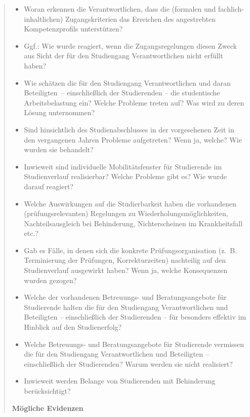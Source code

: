 \begin{quote}
\begin{itemize}
\item
  Woran erkennen die Verantwortlichen, dass die (formalen und
  fachlich-inhaltlichen) Zugangskriterien das Erreichen des angestrebten
  Kompetenzprofils unterstützen?
\item
  Ggf.: Wie wurde reagiert, wenn die Zugangsregelungen diesen Zweck aus
  Sicht der für den Studiengang Verantwortlichen nicht erfüllt haben?
\item
  Wie schätzen die für den Studiengang Verantwortlichen und daran
  Beteiligten~-- einschließlich der Studierenden -- die studentische
  Arbeitsbelastung ein? Welche Probleme treten auf? Was wird zu deren
  Lösung unternommen?
\item
  Sind hinsichtlich des Studienabschlusses in der vorgesehenen Zeit in
  den vergangenen Jahren Probleme aufgetreten? Wenn ja, welche? Wie
  wurden sie behandelt?
\item
  Inwieweit sind individuelle Mobilitätsfenster für Studierende im
  Studienverlauf realisierbar? Welche Probleme gibt es? Wie wurde darauf
  reagiert?
\item
  Welche Auswirkungen auf die Studierbarkeit haben die vorhandenen
  (prüfungsrelevanten) Regelungen zu Wiederholungsmöglichkeiten,
  Nachteilsausgleich bei Behinderung, Nichterscheinen im Krankheitsfall
  etc.?
\item
  Gab es Fälle, in denen sich die konkrete Prüfungsorganisation (z.~B.
  Terminierung der Prüfungen, Korrekturzeiten) nachteilig auf den
  Studienverlauf ausgewirkt haben? Wenn ja, welche Konsequenzen wurden
  gezogen?
\item
  Welche der vorhandenen Betreuungs- und Beratungsangebote für
  Studierende halten die für den Studiengang Verantwortlichen und
  Beteiligten -- einschließlich der Studierenden -- für besonders
  effektiv im Hinblick auf den Studienerfolg?
\item
  Welche Betreuungs- und Beratungsangebote für Studierende vermissen die
  für den Studiengang Verantwortlichen und Beteiligten -- einschließlich
  der Studierenden? Warum werden sie nicht realisiert?
\item
  Inwieweit werden Belange von Studierenden mit Behinderung
  berücksichtigt?
\end{itemize}

\textbf{Mögliche Evidenzen}


\end{quote}
